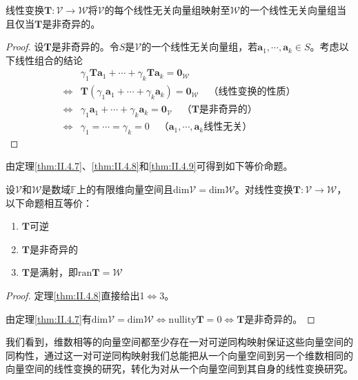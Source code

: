 \documentclass[main.tex]{subfiles}
\begin{document}
\begin{theorem}\label{thm:II.4.9}
线性变换$\mathbf{T}:\mathcal{V}\rightarrow\mathcal{W}$将$\mathcal{V}$的每个线性无关向量组映射至$\mathcal{W}$的一个线性无关向量组当且仅当$\mathbf{T}$是非奇异的。
\end{theorem}
\begin{proof}
设$\mathbf{T}$是非奇异的。令$S$是$\mathcal{V}$的一个线性无关向量组，若$\mathbf{a}_1,\cdots,\mathbf{a}_k\in S$。考虑以下线性组合的结论
\begin{align*}
&\gamma_1\mathbf{Ta}_1+\cdots+\gamma_k\mathbf{Ta}_k=\mathbf{0}_\mathcal{W}\\
\Leftrightarrow&\mathbf{T}\left(\gamma_1\mathbf{a}_1+\cdots+\gamma_k\mathbf{a}_k\right)=\mathbf{0}_\mathcal{W}\quad\text{（线性变换的性质）}\\
\Leftrightarrow&\gamma_1\mathbf{a}_1+\cdots+\gamma_k\mathbf{a}_k=\mathbf{0}_\mathcal{V}\quad\text{（$\mathbf{T}$是非奇异的）}\\
\Leftrightarrow &\gamma_1=\cdots=\gamma_k=0\quad\text{（$\mathbf{a}_1,\cdots,\mathbf{a}_k$线性无关）}
\end{align*}
\end{proof}

由定理\ref{thm:II.4.7}、\ref{thm:II.4.8}和\ref{thm:II.4.9}可得到如下等价命题。

\begin{theorem}\label{thm:II.4.11}
设$\mathcal{V}$和$\mathcal{W}$是数域$\mathbb{F}$上的有限维向量空间且$\mathrm{dim}\mathcal{V}=\mathrm{dim}\mathcal{W}$。对线性变换$\mathbf{T}:\mathcal{V}\rightarrow\mathcal{W}$，以下命题相互等价：
\begin{enumerate}
    \item $\mathbf{T}$可逆
    \item $\mathbf{T}$是非奇异的
    \item $\mathbf{T}$是满射，即$\mathrm{ran}\mathbf{T}=\mathcal{W}$
\end{enumerate}
\end{theorem}
\begin{proof}
定理\ref{thm:II.4.8}直接给出1$\Leftrightarrow$3。

由定理\ref{thm:II.4.7}有$\mathrm{dim}\mathcal{V}=\mathrm{dim}\mathcal{W}\Leftrightarrow\mathrm{nullity}\mathbf{T}=0\Leftrightarrow\mathbf{T}$是非奇异的。
\end{proof}

我们看到，维数相等的向量空间都至少存在一对可逆同构映射保证这些向量空间的同构性，通过这一对可逆同构映射我们总能把从一个向量空间到另一个维数相同的向量空间的线性变换的研究，转化为对从一个向量空间到其自身的线性变换研究。
\end{document}
